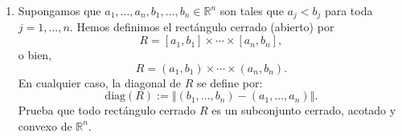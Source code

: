 \documentclass[12pt]{article}
\newcommand{\norm}[1]{\left\Vert#1\right\Vert}
\newcommand{\diag}{\mathrm{diag}}
\newcommand{\Int}{\mathrm{int}}
\newcommand{\R}{\mathbb R}
\newcommand{\x}{\mathrm x}
\begin{document}
\begin{enumerate}
Por otro lado, como $B(\x, \varepsilon) \subseteq \partial \Omega = \Omega \setminus \Int(\Omega)$, se tiene que
\[
B(\x, \varepsilon) \cap \Int(\Omega) = \emptyset.
\]
En particular, $\x \notin \Int(\Omega)$, ya que si $\x \in \Int(\Omega)$, entonces $\x \in B(\x, \varepsilon) \cap \Int(\Omega)$, lo cual contradice que dicha intersección sea vacía.

Hemos llegado a una contradicción: por un lado, $\x \in \Int(\Omega)$, y por otro lado, $\x \notin \Int(\Omega)$. Por lo tanto, nuestra suposición inicial de que $\Int(\partial \Omega) \neq \emptyset$ debe ser falsa.

Concluimos que
\[
\boxed{\Int(\partial \Omega) = \emptyset.}
\]

\textbf{Demostración alternativa (más directa):}

Sea $\x \in \partial \Omega$ un punto arbitrario de la frontera. Demostraremos que $\x$ no puede ser un punto interior de $\partial \Omega$.

Por definición de frontera, toda bola abierta centrada en $\x$ contiene tanto puntos de $\Omega$ como puntos de $\R^n \setminus \Omega$.

Supongamos, para buscar una contradicción, que existe $\varepsilon > 0$ tal que $B(\x, \varepsilon) \subseteq \partial \Omega$. Entonces, en particular, $B(\x, \varepsilon) \subseteq \overline{\Omega} = \Omega$ (ya que $\Omega$ es cerrado). Esto significa que $\x \in \Int(\Omega)$.

Pero $\Int(\Omega) \cap \partial \Omega = \emptyset$, ya que $\partial \Omega = \overline{\Omega} \setminus \Int(\Omega)$. Esto contradice que $B(\x, \varepsilon) \subseteq \partial \Omega$ y que $\x \in B(\x, \varepsilon)$.

Por lo tanto, ningún punto de $\partial \Omega$ puede ser un punto interior de $\partial \Omega$, lo que implica que $\Int(\partial \Omega) = \emptyset$.

\item Supongamos que $a_1,\ldots,a_n,b_1,\ldots,b_n\in \R^n$ son tales que $a_j<b_j$ para toda $j=1,\ldots,n$. Hemos definimos el rectángulo cerrado (abierto) por
\[ R = [a_1,b_1]\times \cdots\times [a_n,b_n], \]
o bien,
\[ R = (a_1,b_1)\times \cdots\times (a_n,b_n). \]
En cualquier caso, la \textsf{diagonal} de $R$ se define por:
\[ \diag(R) := \norm{(b_1,\ldots,b_n) - (a_1,\ldots,a_n)}. \]
Prueba que todo rectángulo cerrado $R$ es un subconjunto cerrado, acotado y convexo de $\R^n$. 

\end{enumerate}
\end{document}
